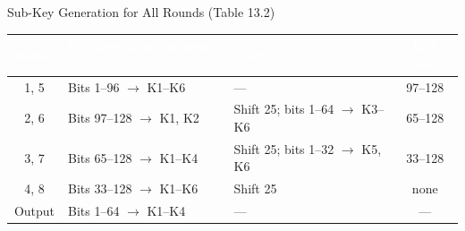 \documentclass[aspectratio=169,11pt,xcolor={table}]{beamer}
\begin{document}
\begin{frame}{Sub-Key Generation for All Rounds (Table 13.2)}
  \centering
  \renewcommand{\arraystretch}{1.3}
  \small
  \begin{tabular}{c >{\raggedright\arraybackslash}p{4.2cm} >{\raggedright\arraybackslash}p{4.2cm} c}
    \toprule
    \rowcolor{navy}\textcolor{white}{\textbf{Round}} & \textcolor{white}{\textbf{Sub-keys from current key}} & \textcolor{white}{\textbf{Then}} & \textcolor{white}{\textbf{Left over}}\\
    \midrule
    1, 5 & Bits 1--96 $\rightarrow$ K1--K6 & --- & 97--128\\
    2, 6 & Bits 97--128 $\rightarrow$ K1, K2 & Shift 25; bits 1--64 $\rightarrow$ K3--K6 & 65--128\\
    3, 7 & Bits 65--128 $\rightarrow$ K1--K4 & Shift 25; bits 1--32 $\rightarrow$ K5, K6 & 33--128\\
    4, 8 & Bits 33--128 $\rightarrow$ K1--K6 & Shift 25 & none\\
    Output & Bits 1--64 $\rightarrow$ K1--K4 & --- & ---\\
    \bottomrule
  \end{tabular}
  \vspace{4mm}

\end{frame}
\end{document}
